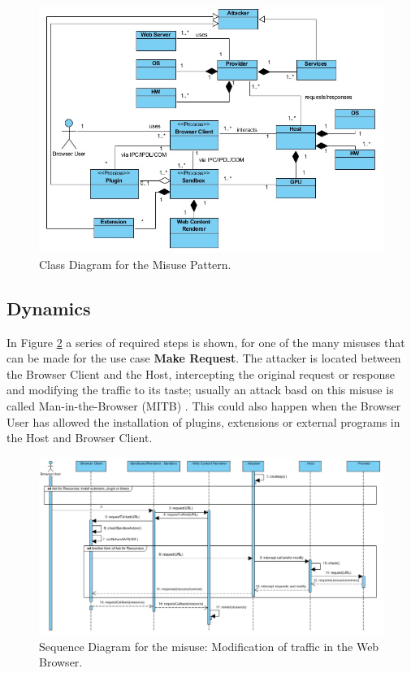\documentclass{sig-alternate-05-2015}
\begin{document}
\begin{figure}[h!t]
  \centering
  \includegraphics[scale=0.85]{figures/patronMisuse_v6.jpg}
  \caption{Class Diagram for the Misuse Pattern.}
  \label{fig:BIMisuse}
\end{figure}

\subsection*{Dynamics}
In Figure \ref{fig:SeqMisuse} a series of required steps is shown, for one of the many misuses that can be made for the use case \textbf{Make Request}. The attacker is located between the Browser Client and the Host, intercepting the original request or response and modifying the traffic to its taste; usually an attack basd on this misuse is called Man-in-the-Browser (MITB) \cite{Liu2012, Barth2010, Utakrit2009, Dougan2012}. This could also happen when the Browser User has allowed the installation of plugins, extensions or external programs in the Host and Browser Client.

\begin{figure}[h!t]
  \centering
  \includegraphics[scale=0.61]{figures/MakeRequestMisuse.jpg}
  \caption{Sequence Diagram for the misuse: Modification of traffic in the Web Browser.}
  \label{fig:SeqMisuse}
\end{figure}
\end{document}
